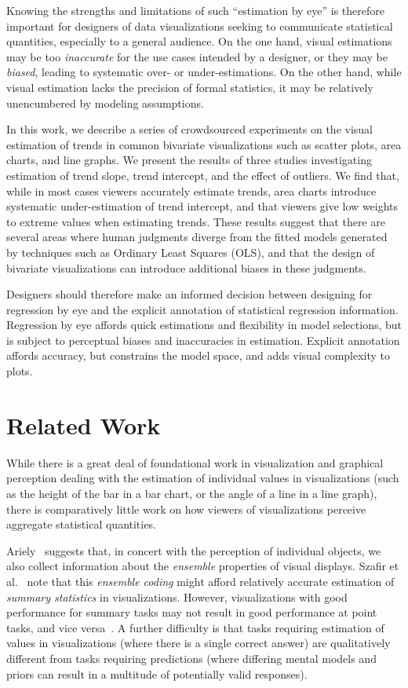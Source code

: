 \documentclass{sigchi}
\begin{document}
Knowing the strengths and limitations of such ``estimation by eye'' is therefore important for designers of data visualizations seeking to communicate statistical quantities, especially to a general audience. On the one hand, visual estimations may be too \emph{inaccurate} for the use cases intended by a designer, or they may be \emph{biased}, leading to systematic over- or under-estimations. On the other hand, while visual estimation lacks the precision of formal statistics, it may be relatively unencumbered by modeling assumptions.

In this work, we describe a series of crowdsourced experiments on the visual estimation of trends in common bivariate visualizations such as scatter plots, area charts, and line graphs. We present the results of three studies investigating estimation of trend slope, trend intercept, and the effect of outliers. We find that, while in most cases viewers accurately estimate trends, area charts introduce systematic under-estimation of trend intercept, and that viewers give low weights to extreme values when estimating trends. These results suggest that there are several areas where human judgments diverge from the fitted models generated by techniques such as Ordinary Least Squares (OLS), and that the design of bivariate visualizations can introduce additional biases in these judgments.

Designers should therefore make an informed decision between designing for regression by eye and the explicit annotation of statistical regression information. Regression by eye affords quick estimations and flexibility in model selections, but is subject to perceptual biases and inaccuracies in estimation. Explicit annotation affords accuracy, but constrains the model space, and adds visual complexity to plots.

\section{Related Work}

While there is a great deal of foundational work in visualization and graphical perception dealing with the estimation of individual values in visualizations (such as the height of the bar in a bar chart, or the angle of a line in a line graph), there is comparatively little work on how viewers of visualizations perceive aggregate statistical quantities.

Ariely~\cite{ariely2001seeing} suggests that, in concert with the perception of individual objects, we also collect information about the \emph{ensemble} properties of visual displays. Szafir et al.~\cite{szafir2016four} note that this \emph{ensemble coding} might afford relatively accurate estimation of \emph{summary statistics} in visualizations. However, visualizations with good performance for summary tasks may not result in good performance at point tasks, and vice versa~\cite{albers2014task,fuchs2013evaluation}. A further difficulty is that tasks requiring estimation of values in visualizations (where there is a single correct answer) are qualitatively different from tasks requiring predictions (where differing mental models and priors can result in a multitude of potentially valid responses).
\end{document}
